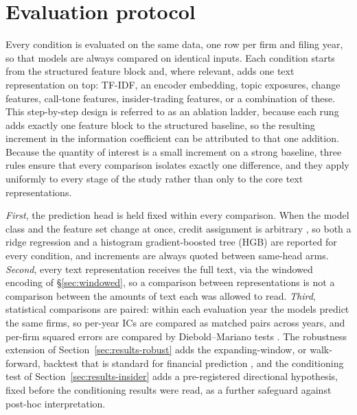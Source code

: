\documentclass[logo,msc,ai]{infthesis}        %
\begin{document}
\section{Evaluation protocol}
\label{sec:protocol}
Every condition is evaluated on the same data, one row per firm and filing year, so that models are always compared on identical inputs. Each condition starts from the structured feature block and, where relevant, adds one text representation on top: TF-IDF, an encoder embedding, topic exposures, change features, call-tone features, insider-trading features, or a combination of these. This step-by-step design is referred to as an ablation ladder, because each rung adds exactly one feature block to the structured baseline, so the resulting increment in the information coefficient can be attributed to that one addition. Because the quantity of interest is a small increment on a strong baseline, three rules ensure that every comparison isolates exactly one difference, and they apply uniformly to every stage of the study rather than only to the core text representations.

\emph{First}, the prediction head is held fixed within every comparison. When the model class and the feature set change at once, credit assignment is arbitrary \cite{lipton2019troubling}, so both a ridge regression \cite{hoerl1970ridge} and a histogram gradient-boosted tree (HGB) \cite{friedman2001greedy} are reported for every condition, and increments are always quoted between same-head arms. \emph{Second}, every text representation receives the full text, via the windowed encoding of \S\ref{sec:windowed}, so a comparison between representations is not a comparison between the amounts of text each was allowed to read. \emph{Third}, statistical comparisons are paired: within each evaluation year the models predict the same firms, so per-year ICs are compared as matched pairs across years, and per-firm squared errors are compared by Diebold--Mariano tests \cite{diebold1995comparing}. The robustness extension of Section~\ref{sec:results-robust} adds the expanding-window, or walk-forward, backtest that is standard for financial prediction \cite{de2018advances}, and the conditioning test of Section~\ref{sec:results-insider} adds a pre-registered directional hypothesis, fixed before the conditioning results were read, as a further safeguard against post-hoc interpretation.
\end{document}
